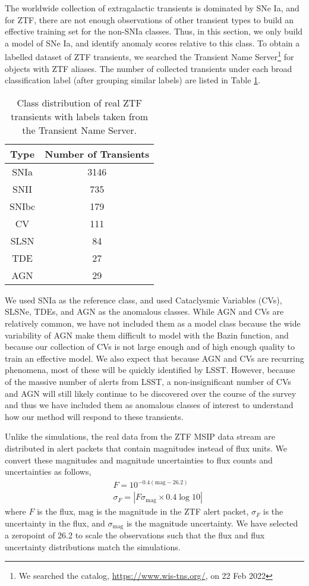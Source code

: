 \documentclass[fleqn,usenatbib]{mnras}
\begin{document}
The worldwide collection of extragalactic transients is dominated by SNe Ia, and for ZTF, there are not enough observations of other transient types to build an effective training set for the non-SNIa classes. Thus, in this section, we only build a model of SNe Ia, and identify anomaly scores relative to this class. To obtain a labelled dataset of ZTF transients, we searched the Transient Name Server\footnote{We searched the catalog, \url{https://www.wis-tns.org/}, on 22 Feb 2022} for objects with ZTF aliases. The number of collected transients under each broad classification label (after grouping similar labels) are listed in Table \ref{tab:real_data_population}.
\begin{table}
    \centering
    \begin{tabular}{c|c}
         Type & Number of Transients \\ \hline
         SNIa   &   3146    \\
         SNII   &   735     \\
         SNIbc  &   179     \\
         CV   &   111     \\
         SLSN  &   84     \\
         TDE   &   27     \\
         AGN   &   29     \\
    \end{tabular}
    \caption{Class distribution of real ZTF transients with labels taken from the Transient Name Server.}
    \label{tab:real_data_population}
\end{table}
We used SNIa as the reference class, and used Cataclysmic Variables (CVs), SLSNe, TDEs, and AGN as the anomalous classes. While AGN and CVs are relatively common, we have not included them as a model class because the wide variability of AGN make them difficult to model with the Bazin function, and because our collection of CVs is not large enough and of high enough quality to train an effective model. We also expect that because AGN and CVs are recurring phenomena, most of these will be quickly identified by LSST. However, because of the massive number of alerts from LSST, a non-insignificant number of CVs and AGN will still likely continue to be discovered over the course of the survey and thus we have included them as anomalous classes of interest to understand how our method will respond to these transients.

Unlike the simulations, the real data from the ZTF MSIP data stream are distributed in alert packets that contain magnitudes instead of flux units. We convert these magnitudes and magnitude uncertainties to flux counts and uncertainties as follows,
\begin{align}
    &F = 10^{-0.4(\mathrm{mag} - \mathrm{26.2})} \\
    &\sigma_F = |F \sigma_{\mathrm{mag}} \times 0.4\log{10}|
\end{align}
where $F$ is the flux, $\mathrm{mag}$ is the magnitude in the ZTF alert packet, $\sigma_F$ is the uncertainty in the flux, and $\sigma_\mathrm{mag}$ is the magnitude uncertainty. We have selected a zeropoint of 26.2 to scale the observations such that the flux and flux uncertainty distributions match the simulations.
\end{document}
